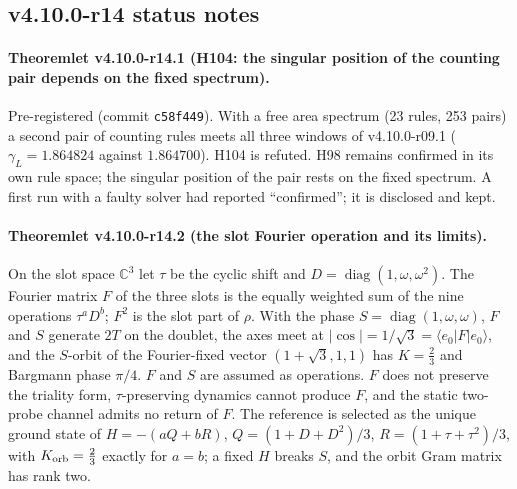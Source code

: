 \subsection*{v4.10.0-r14 status notes}
\label{subsec:v4100-r14-status}

\paragraph{Theoremlet v4.10.0-r14.1 (H104: the singular position of the counting pair depends on the fixed spectrum).}
Pre-registered (commit \texttt{c58f449}).  With a free area spectrum (23 rules, 253 pairs) a second pair of counting rules
meets all three windows of v4.10.0-r09.1 (\(\gamma_L=1.864824\) against \(1.864700\)).  H104 is refuted.  H98 remains confirmed
in its own rule space; the singular position of the pair rests on the fixed spectrum.  A first run with a faulty solver had
reported ``confirmed''; it is disclosed and kept.

\paragraph{Theoremlet v4.10.0-r14.2 (the slot Fourier operation and its limits).}
On the slot space \(\mathbb C^3\) let \(\tau\) be the cyclic shift and \(D=\operatorname{diag}(1,\omega,\omega^2)\).  The Fourier
matrix \(F\) of the three slots is the equally weighted sum of the nine operations \(\tau^aD^b\); \(F^2\) is the slot part of
\(\rho\).  With the phase \(S=\operatorname{diag}(1,\omega,\omega)\), \(F\) and \(S\) generate \(2T\) on the doublet, the axes meet
at \(|\cos|=1/\sqrt3=\langle e_0|F|e_0\rangle\), and the \(S\)-orbit of the Fourier-fixed vector \((1+\sqrt3,1,1)\) has
\(K=\tfrac23\) and Bargmann phase \(\pi/4\).  \(F\) and \(S\) are assumed as operations.  \(F\) does not preserve the triality
form, \(\tau\)-preserving dynamics cannot produce \(F\), and the static two-probe channel admits no return of \(F\).  The
reference is selected as the unique ground state of \(H=-(aQ+bR)\), \(Q=(1+D+D^2)/3\), \(R=(1+\tau+\tau^2)/3\), with
\(K_{\rm orb}=\tfrac23\) exactly for \(a=b\); a fixed \(H\) breaks \(S\), and the orbit Gram matrix has rank two.


